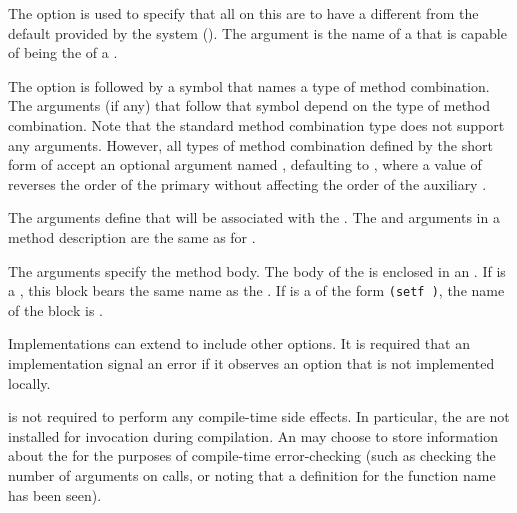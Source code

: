 \itemitem{\bull} 
The  option is used to specify that all  on
this  are to have a different  from the 
default provided by the system ().
The  argument is the name of a  that is capable 
of being the  of a .
 
\itemitem{\bull} 
The  option is followed by a symbol that
names a type of method combination.  The arguments (if any) that
follow that symbol depend on the type of method combination.  Note
that the standard method combination type does not support any
arguments.  However, all types of method combination defined by the
short form of  accept an optional
argument named , defaulting to ,
where a value of  reverses
the order of the primary  without affecting the order of the
auxiliary .
 
\endlist
 
The  arguments define  that will
be associated with the .  The 
and  arguments in a method description
are the same as for .
 
The  arguments specify the method body.  The body of the
 is enclosed in an .
If  is a , this block bears the same name as
the .  If  is a 
 of the
form {\tt (setf )}, the name of the block is .  
 
Implementations can extend  to include other options.
It is required that an implementation signal an error if
it observes an option that is not implemented locally.

 is not required to perform any compile-time side effects.
In particular, the  are not installed for invocation during 
compilation.  An  may choose to store information about
the  for the purposes of compile-time error-checking
(such as checking the number of arguments on calls, or noting that a definition
 for the function name has been seen).

